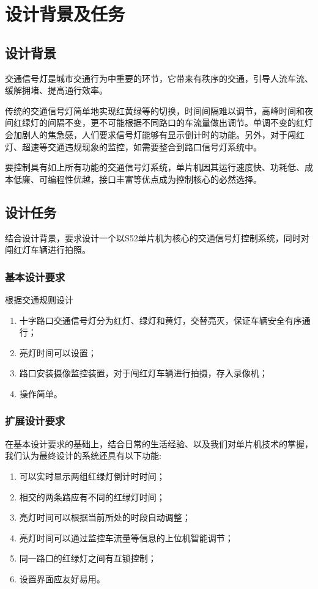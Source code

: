 
\chapter{设计背景及任务}
\label{chap:intro}
\section{设计背景}
交通信号灯是城市交通行为中重要的环节，它带来有秩序的交通，引导人流车流、缓解拥堵、提高通行效率。

传统的交通信号灯简单地实现红黄绿等的切换，时间间隔难以调节，高峰时间和夜间红绿灯的间隔不变，更不可能根据不同路口的车流量做出调节。单调不变的红灯会加剧人的焦急感，人们要求信号灯能够有显示倒计时的功能。另外，对于闯红灯、超速等交通违规现象的监控，如需要整合到路口信号灯系统中。

要控制具有如上所有功能的交通信号灯系统，单片机因其运行速度快、功耗低、成本低廉、可编程性优越，接口丰富等优点成为控制核心的必然选择。
\section{设计任务}
结合设计背景，要求设计一个以S52单片机为核心的交通信号灯控制系统，同时对闯红灯车辆进行拍照。
\subsection{基本设计要求}
根据交通规则设计
\begin{enumerate}
\item 十字路口交通信号灯分为红灯、绿灯和黄灯，交替亮灭，保证车辆安全有序通行；
\item 亮灯时间可以设置；
\item 路口安装摄像监控装置，对于闯红灯车辆进行拍摄，存入录像机；
\item 操作简单。
\end{enumerate}
\subsection{扩展设计要求}
在基本设计要求的基础上，结合日常的生活经验、以及我们对单片机技术的掌握，我们认为最终设计的系统还具有以下功能:
\begin{enumerate}
\item 可以实时显示两组红绿灯倒计时时间；
\item 相交的两条路应有不同的红绿灯时间；
\item 亮灯时间可以根据当前所处的时段自动调整；
\item 亮灯时间可以通过监控车流量等信息的上位机智能调节；
\item 同一路口的红绿灯之间有互锁控制；
\item 设置界面应友好易用。
\end{enumerate}


